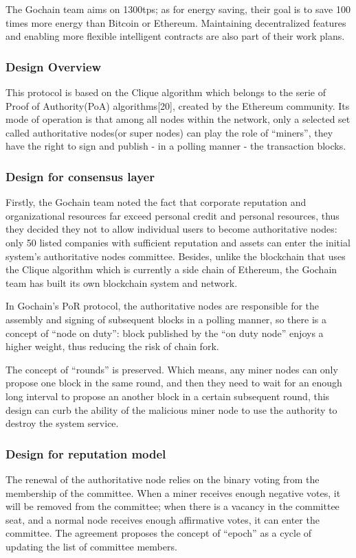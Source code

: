 \documentclass[doublespacing]{bmcart}
\begin{document}
\begin{CJK*}{UTF8}{gbsn}
	The Gochain team aims on 1300tps; as for energy saving, their goal is to save 100 times more energy than Bitcoin or Ethereum. Maintaining decentralized features and enabling more flexible intelligent contracts are also part of their work plans.
	\subsubsection*{Design Overview} 
	 This protocol is based on the Clique algorithm which belongs to the serie of Proof of Authority(PoA) algorithms[20], created by the Ethereum community. Its mode of operation is that among all nodes within the network, only a selected set called authoritative nodes(or super nodes) can play the role of ``miners'', they have the right to sign and publish - in a polling manner - the transaction blocks.
	\subsubsection*{Design for consensus layer}  
	Firstly, the Gochain team noted the fact that corporate reputation and organizational resources far exceed personal credit and personal resources, thus they decided they not to allow individual users to become authoritative nodes: only 50 listed companies with sufficient reputation and assets can enter the initial system’s authoritative nodes committee. Besides, unlike the blockchain that uses the Clique algorithm which is currently a side chain of Ethereum, the Gochain team has built its own blockchain system and network.
	 
	In Gochain's PoR protocol, the authoritative nodes are responsible for the assembly and signing of subsequent blocks in a polling manner, so there is a concept of ``node on duty'': block published by the ``on duty node'' enjoys a higher weight,
thus reducing the risk of chain fork.
		
	The concept of ``rounds'' is preserved. Which means, any miner nodes can only propose one block in the same round, and then they need to wait for an enough long interval to propose an another block in a certain subsequent round, this design can curb the ability of the malicious miner node to use the authority to destroy the system service.
	\subsubsection*{Design for reputation model}  
	The renewal of the authoritative node relies on the binary voting from the membership of  the committee. When a miner receives enough negative votes, it will be removed from the committee; when there is a vacancy in the committee seat, and a normal node receives enough affirmative votes, it can enter the committee. The agreement proposes the concept of ``epoch'' as a cycle of updating the list of committee members.
	

\end{CJK*}
\end{document}
